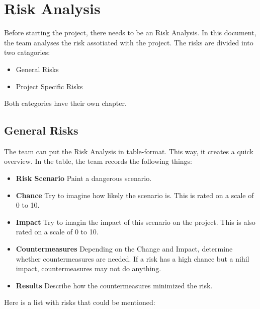 \documentclass[10pt]{report}
\begin{document}
\newpage

\section{Risk Analysis}

Before starting the project, there needs to be an Risk Analysis. In this document, the team analyses the risk assotiated with the project. The risks are divided into two catagories:

\begin{itemize}
	\item General Risks
	\item Project Specific Risks
\end{itemize}

Both categories have their own chapter.

\subsection{General Risks}

The team can put the Risk Analysis in table-format. This way, it creates a quick overview. In the table, the team records the following things:

\begin{itemize}
	\item \textbf{Risk Scenario} Paint a dangerous scenario.
	\item \textbf{Chance} Try to imagine how likely the scenario is. This is rated on a scale of 0 to 10.
	\item \textbf{Impact} Try to imagin the impact of this scenario on the project. This is also rated on a scale of 0 to 10.  
	\item \textbf{Countermeasures} Depending on the Change and Impact, determine whether countermeasures are needed. If a risk has a high chance but a nihil impact, countermeasures may not do anything.
	\item \textbf{Results} Describe how the countermeasures minimized the risk.  
\end{itemize}

Here is a list with risks that could be mentioned:
\end{document}
